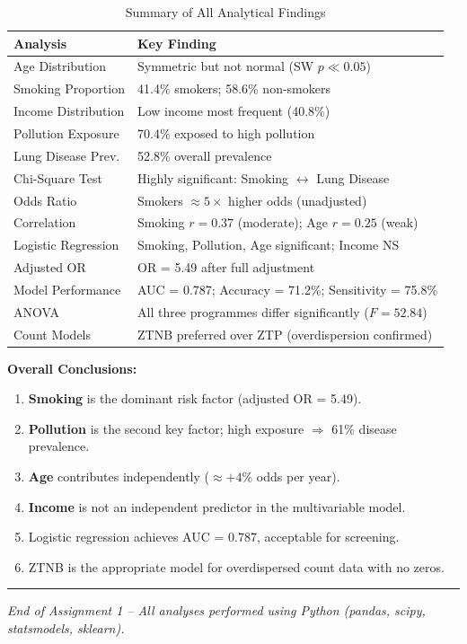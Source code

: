 \documentclass[12pt,a4paper]{article}
\begin{document}
\begin{table}[H]
  \centering
  \caption{Summary of All Analytical Findings}
  \begin{tabularx}{\textwidth}{lX}
    \toprule
    \textbf{Analysis} & \textbf{Key Finding} \\
    \midrule
    Age Distribution    & Symmetric but not normal (SW $p \ll 0.05$) \\
    Smoking Proportion  & 41.4\% smokers; 58.6\% non-smokers \\
    Income Distribution & Low income most frequent (40.8\%) \\
    Pollution Exposure  & 70.4\% exposed to high pollution \\
    Lung Disease Prev.  & 52.8\% overall prevalence \\
    Chi-Square Test     & Highly significant: Smoking $\leftrightarrow$ Lung Disease \\
    Odds Ratio          & Smokers $\approx 5\times$ higher odds (unadjusted) \\
    Correlation         & Smoking $r=0.37$ (moderate); Age $r=0.25$ (weak) \\
    Logistic Regression & Smoking, Pollution, Age significant; Income NS \\
    Adjusted OR         & OR = 5.49 after full adjustment \\
    Model Performance   & AUC = 0.787; Accuracy = 71.2\%; Sensitivity = 75.8\% \\
    ANOVA               & All three programmes differ significantly ($F = 52.84$) \\
    Count Models        & ZTNB preferred over ZTP (overdispersion confirmed) \\
    \bottomrule
  \end{tabularx}
\end{table}

\noindent\textbf{Overall Conclusions:}
\begin{enumerate}[leftmargin=*]
  \item \textbf{Smoking} is the dominant risk factor (adjusted OR = 5.49).
  \item \textbf{Pollution} is the second key factor; high exposure $\Rightarrow$ 61\% disease prevalence.
  \item \textbf{Age} contributes independently ($\approx +4\%$ odds per year).
  \item \textbf{Income} is not an independent predictor in the multivariable model.
  \item Logistic regression achieves AUC = 0.787, acceptable for screening.
  \item ZTNB is the appropriate model for overdispersed count data with no zeros.
\end{enumerate}

\bigskip
\noindent\rule{\linewidth}{0.4pt}
\begin{center}
  \small\textit{End of Assignment 1 -- All analyses performed using Python
  (pandas, scipy, statsmodels, sklearn).}
\end{center}
\end{document}
